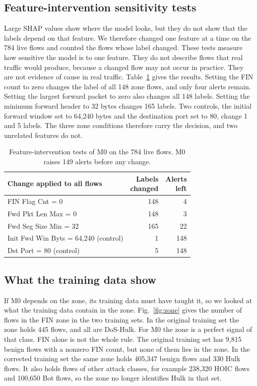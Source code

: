 \documentclass[conference]{IEEEtran}
\begin{document}
\subsection{Feature-intervention sensitivity tests}
Large SHAP values show where the model looks, but they do not show that the labels depend on that feature. We therefore changed one feature at a time on the 784 live flows and counted the flows whose label changed. These tests measure how sensitive the model is to one feature. They do not describe flows that real traffic would produce, because a changed flow may not occur in practice. They are not evidence of cause in real traffic. Table~\ref{tab:interv} gives the results. Setting the FIN count to zero changes the label of all 148 zone flows, and only four alerts remain. Setting the largest forward packet to zero also changes all 148 labels. Setting the minimum forward header to 32 bytes changes 165 labels. Two controls, the initial forward window set to 64,240 bytes and the destination port set to 80, change 1 and 5 labels. The three zone conditions therefore carry the decision, and two unrelated features do not.

\begin{table}[t]
\caption{Feature-intervention tests of M0 on the 784 live flows. M0 raises 149 alerts before any change.}
\label{tab:interv}
\centering
\footnotesize
\setlength{\tabcolsep}{3pt}
\begin{tabular}{lrr}
\toprule
Change applied to all flows & \makecell[r]{Labels\\changed} & \makecell[r]{Alerts\\left} \\
\midrule
FIN Flag Cnt = 0 & 148 & 4 \\
Fwd Pkt Len Max = 0 & 148 & 3 \\
Fwd Seg Size Min = 32 & 165 & 22 \\
\midrule
Init Fwd Win Byts = 64,240 (control) & 1 & 148 \\
Dst Port = 80 (control) & 5 & 148 \\
\bottomrule
\end{tabular}
\end{table}

\subsection{What the training data show}
If M0 depends on the zone, its training data must have taught it, so we looked at what the training data contain in the zone. Fig.~\ref{fig:zone} gives the number of flows in the FIN zone in the two training sets. In the original training set the zone holds 445 flows, and all are DoS-Hulk. For M0 the zone is a perfect signal of that class. FIN alone is not the whole rule. The original training set has 9,815 benign flows with a nonzero FIN count, but none of them lies in the zone. In the corrected training set the same zone holds 405,347 benign flows and 330 Hulk flows. It also holds flows of other attack classes, for example 238,320 HOIC flows and 100,650 Bot flows, so the zone no longer identifies Hulk in that set.
\end{document}
